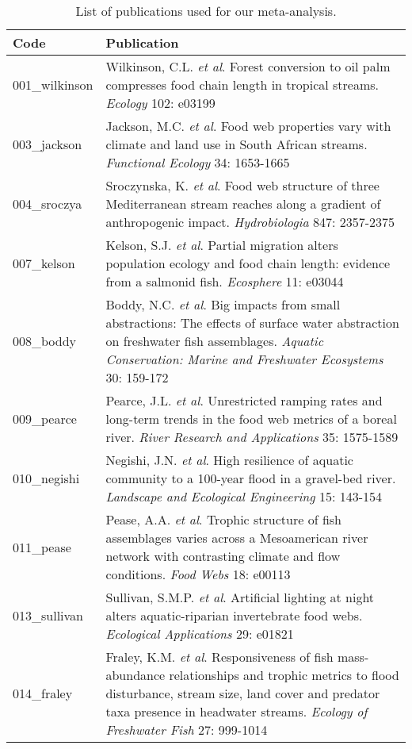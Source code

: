 \begingroup\small
\begin{longtable}{p{}p{}}
\caption{List of publications used for our meta-analysis.
             \label{tab:meta-list}} \\ 
  \hline
Code & Publication \\ 
  \hline
001_wilkinson & Wilkinson, C.L. \textit{et al}. Forest conversion to oil palm compresses food chain length in tropical streams. \textit{Ecology} 102: e03199 \\ 
  003_jackson & Jackson, M.C. \textit{et al}. Food web properties vary with climate and land use in South African streams. \textit{Functional Ecology} 34: 1653-1665 \\ 
  004_sroczya & Sroczynska, K. \textit{et al}. Food web structure of three Mediterranean stream reaches along a gradient of anthropogenic impact. \textit{Hydrobiologia} 847: 2357-2375 \\ 
  007_kelson & Kelson, S.J. \textit{et al}. Partial migration alters population ecology and food chain length: evidence from a salmonid fish. \textit{Ecosphere} 11: e03044 \\ 
  008_boddy & Boddy, N.C. \textit{et al}. Big impacts from small abstractions: The effects of surface water abstraction on freshwater fish assemblages. \textit{Aquatic Conservation: Marine and Freshwater Ecosystems} 30: 159-172 \\ 
  009_pearce & Pearce, J.L. \textit{et al}. Unrestricted ramping rates and long-term trends in the food web metrics of a boreal river. \textit{River Research and Applications} 35: 1575-1589 \\ 
  010_negishi & Negishi, J.N. \textit{et al}. High resilience of aquatic community to a 100-year flood in a gravel-bed river. \textit{Landscape and Ecological Engineering} 15: 143-154 \\ 
  011_pease & Pease, A.A. \textit{et al}. Trophic structure of fish assemblages varies across a Mesoamerican river network with contrasting climate and flow conditions. \textit{Food Webs} 18: e00113 \\ 
  013_sullivan & Sullivan, S.M.P. \textit{et al}. Artificial lighting at night alters aquatic-riparian invertebrate food webs. \textit{Ecological Applications} 29: e01821 \\ 
  014_fraley & Fraley, K.M. \textit{et al}. Responsiveness of fish mass-abundance relationships and trophic metrics to flood disturbance, stream size, land cover and predator taxa presence in headwater streams. \textit{Ecology of Freshwater Fish} 27: 999-1014 \\ 

\end{longtable}
